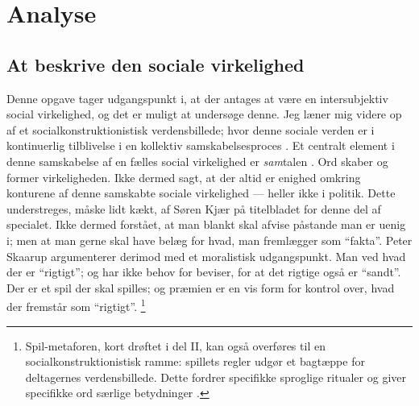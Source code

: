 \renewcommand*{\afterpartskip}{
\vfil
\begin{epigraphs}
\qitem{\itshape
“Jo, hvis dét skal kaldes Fakta, saa benægter a Fakta!”
}{folketingsmedlem Søren Kjær, i debat med Carl Steen Andersen Bille}
\qitem{\itshape
  Politik skal ikke videnskabeliggøres. Der findes ikke noget facit i politik – kun følelser og holdninger. Begreber som sandt og falsk eller godt og ondt har ganske enkelt ikke hjemme i det politiske rum. 
}{Peter Skaarup, i et ugebrev for Dansk Folkeparti, \citeyear{skaarupPolitikErForst2017}}
\end{epigraphs}}

\part{Analyse}\label{part:analysis}

\chapter{At beskrive den sociale virkelighed}

Denne opgave tager udgangspunkt i, at der antages at være en intersubjektiv social virkelighed, og det er muligt at undersøge denne.
Jeg læner mig videre op af et socialkonstruktionistisk verdensbillede; hvor denne sociale verden er i kontinuerlig tilblivelse i en kollektiv samskabelsesproces \autocite{gergenSocialkonstruktionismeOgUddannelse}.
Et centralt element i denne samskabelse af en fælles social virkelighed er \textit{sam}talen \autocite[s. 15f]{gergenSocialkonstruktionismeOgUddannelse}.
Ord skaber og former virkeligheden.
Ikke dermed sagt, at der altid er enighed omkring konturene af denne samskabte sociale virkelighed — heller ikke i politik.
Dette understreges, måske lidt kækt, af Søren Kjær på titelbladet for denne del af specialet.
Ikke dermed forstået, at man blankt skal afvise påstande man er uenig i; men at man gerne skal have belæg for hvad, man fremlægger som “fakta”.
Peter Skaarup argumenterer derimod med et moralistisk udgangspunkt.
Man ved hvad der er “rigtigt”; og har ikke behov for beviser, for at det rigtige også er “sandt”.
Der er et spil der skal spilles; og præmien er en vis form for kontrol over, hvad der fremstår som “rigtigt”.
\footnote{Spil-metaforen, kort drøftet i del II, kan også overføres til en socialkonstruktionistisk ramme:
spillets regler udgør et bagtæppe for deltagernes verdensbillede.
Dette fordrer specifikke sproglige ritualer og giver specifikke ord særlige betydninger \autocite[s. 24f]{gergenSocialkonstruktionismeOgUddannelse}.}

